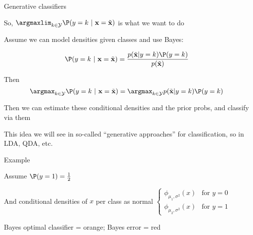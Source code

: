 \documentclass[11pt,compress,t,notes=noshow, xcolor=table]{beamer}
\begin{document}
\begin{framei}[sep=M]{Generative classifiers}


\item So, $\argmaxlim_{k \in \Yspace} \P(y = k~|~ \xv = \xtil)$ is what we want to do

\item Assume we can model densities given classes and use Bayes:

$$
\P(y = k~|~ \xv = \xtil)  = \frac{p(\xtil | y = k) \P(y = k)} {p(\xtil)} 
$$

\item Then
$$
\argmax_{k \in \Yspace} \P(y = k~|~ \xv = \xtil) = \argmax_{k \in \Yspace}  p(\xtil | y = k) \P(y = k)
$$
\item Then we can estimate these conditional densities and the prior probs, and classify via them

\item This idea we will see in so-called ``generative approaches'' for classification, so in LDA, QDA, etc.

\end{framei}


\begin{framei}[sep=M]{Example}

\item  Assume $\P(y = 1) = \frac{1}{2}$ 
\item And conditional densities of $x$ per class as normal $
\begin{cases}
\phi_{\mu_1, \sigma^2}(x) & \text{for } y = 0\\ 
\phi_{\mu_2, \sigma^2}(x) & \text{for } y = 1
\end{cases}$

\item Bayes optimal classifier = orange; Bayes error = red 


\end{framei}

\endlecture
\end{document}
